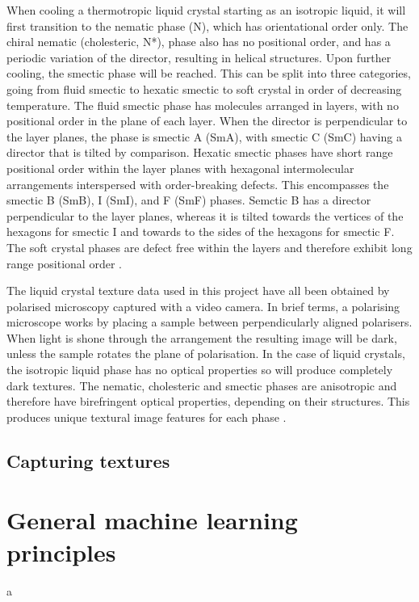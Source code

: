 \documentclass[12pt]{article}
\begin{document}
When cooling a thermotropic liquid crystal starting as an isotropic liquid, it will first transition to the nematic phase (N), which has orientational order only. The chiral nematic (cholesteric, N*), phase also has no positional order, and has a periodic variation of the director, resulting in helical structures. Upon further cooling, the smectic phase will be reached. This can be split into three categories, going from fluid smectic to hexatic smectic to soft crystal in order of decreasing temperature. The fluid smectic phase has molecules arranged in layers, with no positional order in the plane of each layer. When the director is perpendicular to the layer planes, the phase is smectic A (SmA), with smectic C (SmC) having a director that is tilted by comparison. Hexatic smectic phases have short range positional order within the layer planes with hexagonal intermolecular arrangements interspersed with order-breaking defects. This encompasses the smectic B (SmB), I (SmI), and F (SmF) phases. Semctic B has a director perpendicular to the layer planes, whereas it is tilted towards the vertices of the hexagons for smectic I and towards to the sides of the hexagons for smectic F. The soft crystal phases are defect free within the layers and therefore exhibit long range positional order \cite{Dierking03}.

The liquid crystal texture data used in this project have all been obtained by polarised microscopy captured with a video camera. In brief terms, a polarising microscope works by placing a sample between perpendicularly aligned polarisers. When light is shone through the arrangement the resulting image will be dark, unless the sample rotates the plane of polarisation. In the case of liquid crystals, the isotropic liquid phase has no optical properties so will produce completely dark textures. The nematic, cholesteric and smectic phases are anisotropic and therefore have birefringent optical properties, depending on their structures. This produces unique textural image features for each phase \cite{Dierking03}.

\subsection{Capturing textures}
\section{General machine learning principles}
a
\end{document}
